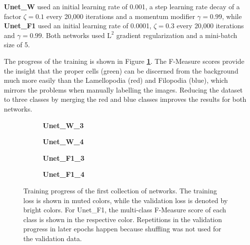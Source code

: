 \textbf{Unet\_W} used an initial learning rate of 0.001, a step learning rate decay of a factor $\zeta = 0.1$ every 20,000 iterations and a momentum modifier $\gamma = 0.99$, while \textbf{Unet\_F1} used an initial learning rate of 0.0001, $\zeta = 0.3$ every 20,000 iterations and $\gamma = 0.99$. Both networks used $\text{L}^2$ gradient regularization and a mini-batch size of 5.

The progress of the training is shown in Figure \textbf{\ref{fig:weighted_f1_training}}. The F-Measure scores provide the insight that the proper cells (green) can be discerned from the background much more easily than the Lamellopodia (red) and Filopodia (blue), which mirrors the problems when manually labelling the images. Reducing the dataset to three classes by merging the red and blue classes improves the results for both networks.\\

\begin {figure}[!ht]
	\begin {subfigure}[b]{0.4\linewidth}
		\scalebox{0.65}{}
		\caption{\textbf{Unet\_W\_3}}
	\end {subfigure}\hspace{1.75cm}
	\begin {subfigure}[b]{0.4\linewidth}
		\scalebox{0.65}{}
		\caption{\textbf{Unet\_W\_4}}
	\end {subfigure}

	\begin {subfigure}[b]{0.4\linewidth}
		\scalebox{0.65}{}
		\caption{\textbf{Unet\_F1\_3}}
	\end {subfigure}\hspace{1.75cm}
	\begin {subfigure}[b]{0.4\linewidth}
		\scalebox{0.65}{}
		\caption{\textbf{Unet\_F1\_4}}
	\end {subfigure}

		\caption[Training progress of the first collection of networks.]{Training progress of the first collection of networks. The training loss is shown in muted colors, while the validation loss is denoted by bright colors. For Unet\_F1, the multi-class F-Measure score of each class is shown in the respective color. Repetitions in the validation progress in later epochs happen because shuffling was not used for the validation data.}
		\label{fig:weighted_f1_training}
\end {figure}

